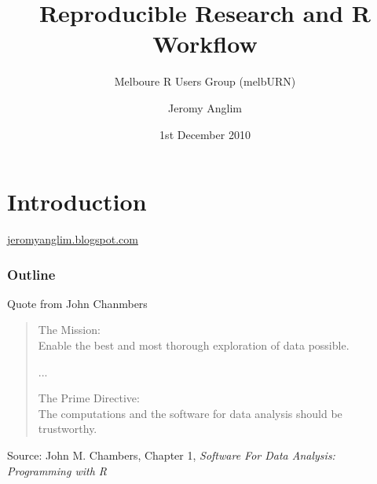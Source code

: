 



\usepackage[overlay, absolute]{textpos}


\title{Reproducible Research and R Workflow}
\subtitle{Melboure R Users Group (melbURN)}
\author{Jeromy Anglim}
\date{1st December 2010}

 
\mode*
\section{Introduction}
\begin{frame}
\titlepage
\begin{center}
	\url{jeromyanglim.blogspot.com}
\end{center}
\end{frame}

\begin{frame}
\frametitle{Outline}
\tableofcontents
\end{frame}

\begin{frame}{Quote from John Chanmbers}

\begin{quote}
The Mission:\\ 
Enable the best and most thorough exploration of data possible.

...

The Prime Directive:\\
The computations and the software for data analysis should be trustworthy.
\end{quote}

\tiny{Source: John M. Chambers,
Chapter 1, \emph{Software For Data Analysis: Programming with R}}
\end{frame}

